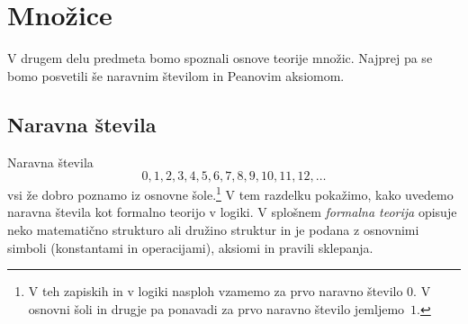 \chapter{Množice}
\label{chap:mnozice}

V drugem delu predmeta bomo spoznali osnove teorije množic. Najprej pa
se bomo posvetili še naravnim številom in Peanovim aksiomom.

\section{Naravna števila}
\label{sec:naravna-stevila}

Naravna števila
%
\begin{equation*}
  0, 1, 2, 3, 4, 5, 6, 7, 8, 9, 10, 11, 12, \ldots
\end{equation*}
%
vsi že dobro poznamo iz osnovne šole.\footnote{V teh zapiskih in v
  logiki nasploh vzamemo za prvo naravno število $0$. V osnovni šoli
  in drugje pa ponavadi za prvo naravno število jemljemo~$1$.} V tem
razdelku pokažimo, kako uvedemo naravna števila kot formalno teorijo v
logiki. V splošnem \emph{formalna teorija} opisuje neko matematično
strukturo ali družino struktur in je podana z osnovnimi simboli
(konstantami in operacijami), aksiomi in pravili sklepanja.

